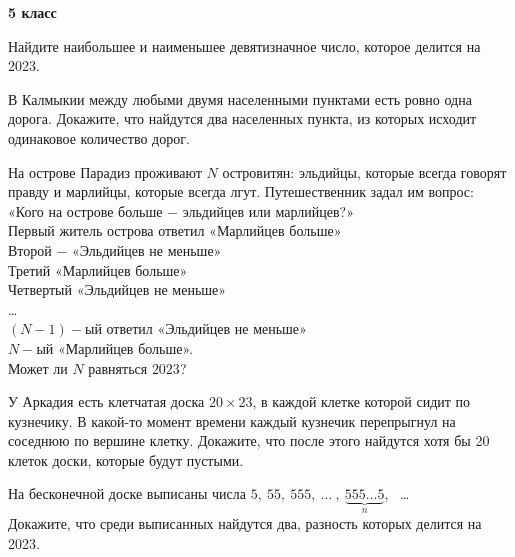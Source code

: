 \centerline{\bf \Huge 5 класс}
 Найдите наибольшее и наименьшее девятизначное число, которое делится на 2023. 

 В Калмыкии между любыми двумя населенными пунктами есть ровно одна дорога. Докажите, что найдутся два населенных пункта, из которых исходит одинаковое количество дорог.

 На острове Парадиз проживают $N$ островитян: эльдийцы, которые всегда говорят правду и марлийцы, которые всегда лгут. Путешественник задал им вопрос: «Кого на острове больше $-$ эльдийцев или марлийцев?» \\
Первый житель острова ответил «Марлийцев больше» \\ 
Второй $-$ «Эльдийцев не меньше» \\
Третий «Марлийцев больше» \\
Четвертый «Эльдийцев не меньше» \\
… \\
$(N-1)-$ый ответил «Эльдийцев не меньше» \\
$N-$ый «Марлийцев больше». \\
Может ли $N$ равняться $2023$?

 У Аркадия есть клетчатая доска $20\times23$, в каждой клетке которой сидит по кузнечику. В какой-то момент времени каждый кузнечик перепрыгнул на соседнюю по вершине клетку. Докажите, что после этого найдутся хотя бы 20 клеток доски, которые будут пустыми.

 На бесконечной доске выписаны числа $5, \ 55, \ 555, \ \dots  \ , \ \underbrace{555\dots 5}_{n}$, \ \dots \\
Докажите, что среди выписанных найдутся два, разность которых делится на 2023.
